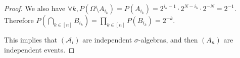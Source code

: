 \begin{proof}[Proof]
    We also have $\forall k, P(\Omega \setminus A_{i_k}) = P(A_{i_k}) = 2^{i_k - 1} \cdot 2^{N-i_k} \cdot 2^{-N} = 2^{-1}$. Therefore
    \begin{math}
        P(\bigcap_{k \in [n]}B_{i_k}) = \prod_{k \in [n]}P(B_{i_k}) = 2^{-k}
    .\end{math}

    This implies that $(\mathcal{A}_i)$ are independent $\sigma $-algebras, and then $(A_n)$ are independent events.

\end{proof}


